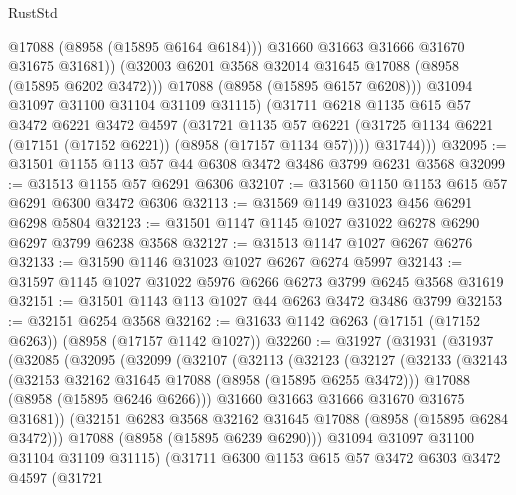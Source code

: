 \begin{lexlean}{RustStd}
\begin{coremodule}
                  @17088
                  (@8958 (@15895 @6164 @6184)))
                @31660
                @31663
                @31666
                @31670
                @31675
                @31681))
            (@32003 @6201 @3568 @32014 @31645 @17088 (@8958 (@15895 @6202 @3472)))
            @17088
            (@8958 (@15895 @6157 @6208)))
          @31094
          @31097
          @31100
          @31104
          @31109
          @31115)
        (@31711
          @6218
          @1135
          @615
          @57
          @3472
          @6221
          @3472
          @4597
          (@31721
            @1135
            @57
            @6221
            (@31725 @1134 @6221 (@17151 (@17152 @6221)) (@8958 (@17157 @1134 @57))))
          @31744)))
@32095 := @31501 @1155 @113 @57 @44 @6308 @3472 @3486 @3799 @6231 @3568
@32099 := @31513 @1155 @57 @6291 @6306
@32107 := @31560 @1150 @1153 @615 @57 @6291 @6300 @3472 @6306
@32113 := @31569 @1149 @31023 @456 @6291 @6298 @5804
@32123 := @31501 @1147 @1145 @1027 @31022 @6278 @6290 @6297 @3799 @6238 @3568
@32127 := @31513 @1147 @1027 @6267 @6276
@32133 := @31590 @1146 @31023 @1027 @6267 @6274 @5997
@32143 := @31597 @1145 @1027 @31022 @5976 @6266 @6273 @3799 @6245 @3568 @31619
@32151 := @31501 @1143 @113 @1027 @44 @6263 @3472 @3486 @3799
@32153 := @32151 @6254 @3568
@32162 := @31633 @1142 @6263 (@17151 (@17152 @6263)) (@8958 (@17157 @1142 @1027))
@32260 := @31927
    (@31931
      (@31937
        (@32085
          (@32095
            (@32099
              (@32107
                (@32113
                  (@32123
                    (@32127
                      (@32133
                        (@32143
                          (@32153 @32162 @31645 @17088 (@8958 (@15895 @6255 @3472)))
                          @17088
                          (@8958 (@15895 @6246 @6266)))
                        @31660
                        @31663
                        @31666
                        @31670
                        @31675
                        @31681))
                    (@32151 @6283 @3568 @32162 @31645 @17088 (@8958 (@15895 @6284 @3472)))
                    @17088
                    (@8958 (@15895 @6239 @6290)))
                  @31094
                  @31097
                  @31100
                  @31104
                  @31109
                  @31115)
                (@31711
                  @6300
                  @1153
                  @615
                  @57
                  @3472
                  @6303
                  @3472
                  @4597
                  (@31721

\end{coremodule}
\end{lexlean}
